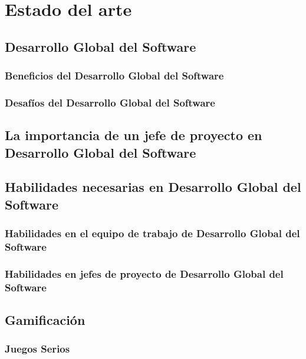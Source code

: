 \chapter{Estado del arte}
\label{cap:Antecedentes}

\section{Desarrollo Global del Software}
\label{sec:DGS}

\subsection{Beneficios del Desarrollo Global del Software}
\label{sec:Beneficios}

\subsection{Desafíos del Desarrollo Global del Software}
\label{sec:Desafios}

\section{La importancia de un jefe de proyecto en Desarrollo Global del Software}
\label{sec:ImportanciaJP}

\section{Habilidades necesarias en Desarrollo Global del Software}
\label{sec:HabilidadesDGS}

\subsection{Habilidades en el equipo de trabajo de Desarrollo Global del Software}
\label{sec:HabilidadesT}

\subsection{Habilidades en jefes de proyecto de Desarrollo Global del Software}
\label{sec:HabilidadesJP}

\section{Gamificación}
\label{sec:Gamificacion}

\subsection{Juegos Serios}
\label{sec:JuegosSerios}

